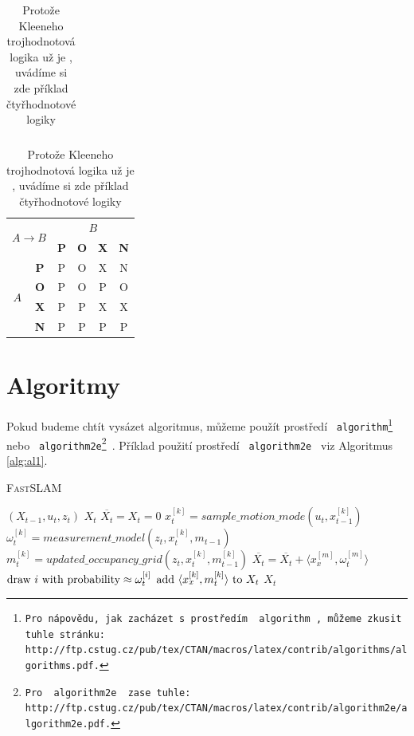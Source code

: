 \documentclass[a4paper, 11pt] {article}
\begin{document}
\begin{table}[h]
\begin{tabular}{|c|c|c|c|c|c|}
\end{tabular}
\begin{tabular}{|c|c|c|c|c|c|}
\hline
\multicolumn{2}{|c|}{\multirow{2}{*}{$A \rightarrow B$}} & \multicolumn{4}{c|}{$B$}                            \\ \cline{3-6} 
\multicolumn{2}{|c|}{}                     & \textbf{P} & \textbf{O} & \textbf{X} & \textbf{N} \\ \hline
\multirow{4}{*}{$A$}       & \textbf{P}      & P          & O          & X          & N          \\ \cline{2-6} 
                         & \textbf{O}      & P          & O          & P          & O          \\ \cline{2-6} 
                         & \textbf{X}      & P          & P          & X          & X          \\ \cline{2-6} 
                         & \textbf{N}      & P          & P          & P          & P          \\ \hline
\end{tabular}
\caption{Protože Kleeneho trojhodnotová logika už je , uvádíme si zde příklad čtyřhodnotové
logiky}
\label{t2}
\end{table}

\section{Algoritmy}
\label{s3}

Pokud budeme chtít vysázet algoritmus, můžeme použít prostředí \texttt{ algorithm\footnote{Pro nápovědu, jak zacházet s prostředím \texttt{ algorithm }, můžeme zkusit tuhle stránku:\\
http://ftp.cstug.cz/pub/tex/CTAN/macros/latex/contrib/algorithms/algorithms.pdf.} } nebo \texttt{ algorithm2e\footnote{Pro \texttt{ algorithm2e } zase tuhle:
http://ftp.cstug.cz/pub/tex/CTAN/macros/latex/contrib/algorithm2e/algorithm2e.pdf.} }.
Příklad použití prostředí \texttt{ algorithm2e } viz Algoritmus \ref{alg:al1}.

\bigskip
\begin{algorithm}
    \caption{\textsc{Fast}SLAM}
    \label{alg:al1}

\begin{algorithmic}[1]
\REQUIRE $(X_{t-1}, u_t, z_t)$
\ENSURE $X_t$
\STATE $\overline{X_t} = X_t = 0$
\STATE $x^{[k]}_{t} = sample\_motion\_mode(u_t ,x^{[k]}_{t-1})$
\STATE $\omega^{[k]}_{t} = measurement\_model(z_t ,x^{[k]}_{t}, m_{t-1})$
\STATE $m^{[k]}_{t} = updated\_occupancy\_grid(z_t ,x^{[k]}_{t}, m_{t-1}^{[k]})$
\STATE $\overline{X_t} = \overline{X_t} + \langle x^{[m]}_{x}, \omega^{[m]}_{t} \rangle$
\ENDFOR
{}
\STATE $\textnormal{draw } i \textnormal{ with probability} \approx \omega^{[i]}_{t}$
\STATE $\textnormal{add } \langle x^{[k]}_{x}, m^{[k]}_{t} \rangle \textnormal{ to } X_t$
\ENDFOR
\RETURN $X_t$
\end{algorithmic}
\end{algorithm}
\end{document}
